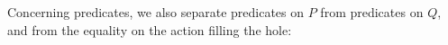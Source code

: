 \documentclass{elsarticle}
\newcommand{\shortotimes}{\!\otimes\!}
\begin{document}
Concerning predicates, we also separate predicates on $P$ from predicates on $Q$, and from the equality on the action filling the hole:
\end{document}
